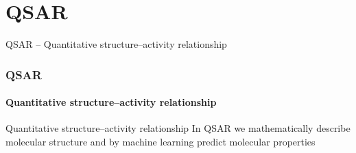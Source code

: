 \documentclass[aspectratio=169,dvipsnames]{beamer}
\begin{document}
\section{QSAR}
\begin{frame}[plain]
\hfill\LARGE QSAR -- Quantitative structure–activity relationship \hfill\normalsize
\end{frame}

    \begin{frame}
        \frametitle{QSAR}
        \framesubtitle{Quantitative structure–activity relationship}

        \begin{block}{Quantitative structure–activity relationship}
            In QSAR we mathematically describe molecular structure and by machine learning predict molecular properties
        \end{block}
    \end{frame}
    
\end{document}
